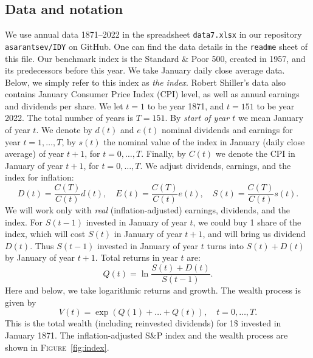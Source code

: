 \documentclass[12pt]{amsart}
\theoremstyle{definition}
\begin{document}
\subsection{Data and notation} We use annual data 1871--2022 in the spreadsheet \texttt{data7.xlsx} in our repository \texttt{asarantsev/IDY} on GitHub. One can find the data details in the \texttt{readme} sheet of this file. Our benchmark index is the Standard \& Poor 500, created in 1957, and its predecessors before this year. We take January daily close average data. Below, we simply refer to this index as {\it the index}. Robert Shiller's data also contains January Consumer Price Index (CPI) level, as well as annual earnings and dividends per share. We let $t = 1$ to be year 1871, and $t = 151$ to be year 2022. The total number of years is $T = 151$. By {\it start of year $t$} we mean January of year $t$. We denote by $d(t)$ and $e(t)$ nominal dividends and earnings for year $t = 1, \ldots, T$, by $s(t)$ the nominal value of the index in January (daily close average) of year $t+1$, for $t = 0, \ldots, T$. Finally, by $C(t)$ we denote the CPI in January of year $t+1$, for $t = 0, \ldots, T$. We adjust dividends, earnings, and the index for inflation:
$$
D(t) = \frac{C(T)}{C(t)}d(t),\quad E(t) = \frac{C(T)}{C(t)}e(t),\quad S(t) = \frac{C(T)}{C(t)}s(t).
$$
We will work only with {\it real} (inflation-adjusted) earnings, dividends, and the index.  For $S(t-1)$ invested in January of year $t$, we could buy 1 share of the index, which will cost $S(t)$ in January of year $t+1$, and will bring us dividend $D(t)$. Thus $S(t-1)$ invested in January of year $t$ turns into $S(t) + D(t)$ by January of year $t+1$. Total returns in year $t$ are:
$$
Q(t) = \ln\frac{S(t)+D(t)}{S(t-1)}.
$$
Here and below, we take logarithmic returns and growth. The wealth process is given by 
\begin{equation}
\label{eq:wealth}
V(t) = \exp(Q(1) + \ldots + Q(t)),\quad t = 0, \ldots, T.
\end{equation}
This is the total wealth (including reinvested dividends) for 1\$ invested in January 1871. The inflation-adjusted S\&P index and the wealth process are shown in \textsc{Figure}~\ref{fig:index}. 
\end{document}
